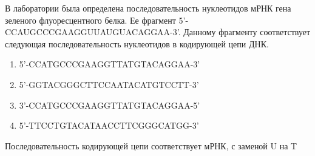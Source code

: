 
В лаборатории была определена последовательность нуклеотидов мРНК гена зеленого флуоресцентного
белка. Ее фрагмент 5'-CCAUGCCCGAAGGUUAUGUACAGGAA-3'. Данному фрагменту соответствует следующая
последовательность нуклеотидов в кодирующей цепи ДНК.

\begin{enumerate}
    \item 5'-CCATGCCCGAAGGTTATGTACAGGAA-3'
    \item 5'-GGTACGGGCTTCCAATACATGTCCTT-3'
    \item 3’-CCATGCCCGAAGGTTATGTACAGGAA-5'
    \item 5’-TTCCTGTACATAACCTTCGGGCATGG-3’
\end{enumerate}

\explanationSection

Последовательность кодирующей цепи соответствует мРНК, с заменой U на T


